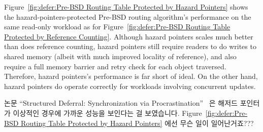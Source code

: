 Figure~\ref{fig:defer:Pre-BSD Routing Table Protected by Hazard Pointers}
shows the hazard-pointers-protected Pre-BSD routing algorithm's
performance on the same read-only workload as for
Figure~\ref{fig:defer:Pre-BSD Routing Table Protected by Reference Counting}.
Although hazard pointers scales much better than does reference counting,
hazard pointers still require readers to do writes to shared
memory (albeit with much improved locality of reference),
and also require a full memory barrier and retry check for each
object traversed.
Therefore, hazard pointers's performance is far short of ideal.
On the other hand, hazard pointers do operate correctly for workloads
involving concurrent updates.
\fi

\QuickQuiz{}
	논문 ``Structured Deferral: Synchronization via
	Procrastination''~\cite{McKenney:2013:SDS:2483852.2483867} 은 해저드
	포인터가 이상적인 경우에 가까운 성능을 보인다는 걸 보였습니다.
	Figure~\ref{fig:defer:Pre-BSD Routing Table Protected by Hazard Pointers}
	에선 무슨 일이 일어난거죠???
	\iffalse

